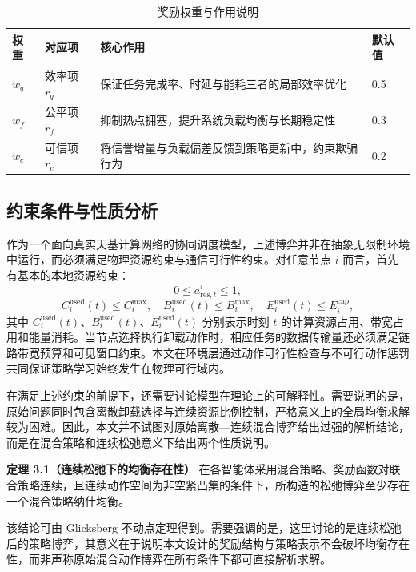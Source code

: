\documentclass[UTF8,12pt,oneside]{ctexbook}
\begin{document}
\begin{table}[H]
\centering
\caption{奖励权重与作用说明}
\label{tab:reward_weight}
\begin{tabularx}{\textwidth}{C{1.8cm}C{2.2cm}Y C{1.5cm}}
\toprule
权重 & 对应项 & 核心作用 & 默认值 \\
\midrule
$w_q$ & 效率项 $r_q$ & 保证任务完成率、时延与能耗三者的局部效率优化 & 0.5 \\
$w_f$ & 公平项 $r_f$ & 抑制热点拥塞，提升系统负载均衡与长期稳定性 & 0.3 \\
$w_c$ & 可信项 $r_c$ & 将信誉增量与负载偏差反馈到策略更新中，约束欺骗行为 & 0.2 \\
\bottomrule
\end{tabularx}
\end{table}

\subsection{约束条件与性质分析}

作为一个面向真实天基计算网络的协同调度模型，上述博弈并非在抽象无限制环境中运行，而必须满足物理资源约束与通信可行性约束。对任意节点 $i$ 而言，首先有基本的本地资源约束：
\begin{equation}
  0 \le a_{\mathrm{res},t}^i \le 1,
  \label{eq:res_ratio}
\end{equation}
\begin{equation}
  C_i^{\mathrm{used}}(t)\le C_i^{\max},\quad
  B_i^{\mathrm{used}}(t)\le B_i^{\max},\quad
  E_i^{\mathrm{used}}(t)\le E_i^{\mathrm{cap}},
  \label{eq:resource_const}
\end{equation}
其中 $C_i^{\mathrm{used}}(t)$、$B_i^{\mathrm{used}}(t)$、$E_i^{\mathrm{used}}(t)$ 分别表示时刻 $t$ 的计算资源占用、带宽占用和能量消耗。当节点选择执行卸载动作时，相应任务的数据传输量还必须满足链路带宽预算和可见窗口约束。本文在环境层通过动作可行性检查与不可行动作惩罚共同保证策略学习始终发生在物理可行域内。

在满足上述约束的前提下，还需要讨论模型在理论上的可解释性。需要说明的是，原始问题同时包含离散卸载选择与连续资源比例控制，严格意义上的全局均衡求解较为困难。因此，本文并不试图对原始离散—连续混合博弈给出过强的解析结论，而是在混合策略和连续松弛意义下给出两个性质说明。

\textbf{定理 3.1（连续松弛下的均衡存在性）} 在各智能体采用混合策略、奖励函数对联合策略连续，且连续动作空间为非空紧凸集的条件下，所构造的松弛博弈至少存在一个混合策略纳什均衡\cite{ref7}。

该结论可由 Glicksberg 不动点定理得到。需要强调的是，这里讨论的是连续松弛后的策略博弈，其意义在于说明本文设计的奖励结构与策略表示不会破坏均衡存在性，而非声称原始混合动作博弈在所有条件下都可直接解析求解。
\end{document}
